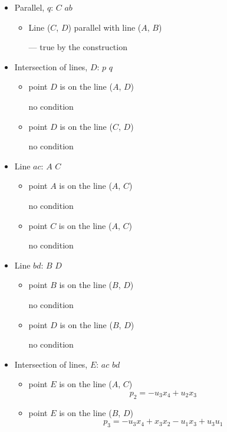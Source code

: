 \documentclass[a4paper]{article}
\begin{document}
\begin{itemize}
\item 

Parallel, $q$: $C$ $ab$ 
\begin{itemize}

\item Line ($C$, $D$) parallel with line ($A$, $B$)

 --- true by the construction

\end{itemize}

\item 

Intersection of lines, $D$: $p$ $q$ 
\begin{itemize}

\item 

point $D$ is on the line ($A$, $D$)


no condition\item 

point $D$ is on the line ($C$, $D$)


no condition\end{itemize}

\item 

Line $ac$: $A$ $C$ 
\begin{itemize}

\item 

point $A$ is on the line ($A$, $C$)


no condition\item 

point $C$ is on the line ($A$, $C$)


no condition\end{itemize}

\item 

Line $bd$: $B$ $D$ 
\begin{itemize}

\item 

point $B$ is on the line ($B$, $D$)


no condition\item 

point $D$ is on the line ($B$, $D$)


no condition\end{itemize}

\item 

Intersection of lines, $E$: $ac$ $bd$ 
\begin{itemize}

\item 

point $E$ is on the line ($A$, $C$)
$$
p_{2}  =  -u_{3}x_{4}+u_{2}x_{3}
$$
\item 

point $E$ is on the line ($B$, $D$)
$$
p_{3}  =  -u_{3}x_{4}+x_{3}x_{2}-u_{1}x_{3}+u_{3}u_{1}
$$
\end{itemize}

\end{itemize}
\end{document}
